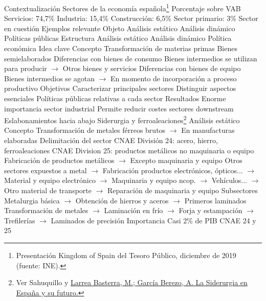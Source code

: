 \documentclass{nuevotema}
\begin{document}
\begin{esquemal}
	\1[] 
		\2 Contextualización
			\3 Sectores de la economía española\footnote{Presentación Kingdom of Spain del Tesoro Público, diciembre de 2019 (fuente: INE).}
				\4 Porcentaje sobre VAB
				\4 Servicios: 74,7\%
				\4 Industria: 15,4\%
				\4 Construcción: 6,5\%
				\4 Sector primario: 3\%
			\3 Sector en cuestión
			\3 Ejemplos relevante
		\2 Objeto
			\3 Análisis estático
			\3 Análisis dinámico
			\3 Políticas públicas
		\2 Estructura
			\3 Análisis estático
			\3 Análisis dinámico
			\3 Política económica
	\1 
		\2 Idea clave
			\3 Concepto
				\4 Transformación de materias primas
				\4[$\to$] Bienes semielaborados
				\4 Diferencias con bienes de consumo
				\4[] Bienes intermedios se utilizan para producir
				\4[] $\to$ Otros bienes y servicios
				\4 Diferencias con bienes de equipo
				\4[] Bienes intermedios se agotan
				\4[] $\to$ En momento de incorporación a proceso productivo
			\3 Objetivos
				\4 Caracterizar principales sectores
				\4 Distinguir aspectos esenciales
				\4 Políticas públicas relativas a cada sector
			\3 Resultados
				\4 Enorme importancia sector industrial
				\4 Permite reducir costes sectores downstream
				\4 Eslabonamientos hacia abajo
		\2 Siderurgia y ferroaleaciones\footnote{Ver Sahuquillo y \href{https://www.mincotur.gob.es/Publicaciones/Publicacionesperiodicas/EconomiaIndustrial/RevistaEconomiaIndustrial/406/LARREA\%20Y\%20GARCIA.pdf}{Larrea Basterra, M.; García Berezo, A. La Siderurgia en España y su futuro.}}
			\3 Análisis estático
				\4 Concepto
				\4[] Transformación de metales férreos brutos
				\4[] $\to$ En manufacturas elaboradas
				\4 Delimitación del sector
				\4[] CNAE División 24: acero, hierro, ferroaleaciones
				\4[] CNAE Division 25: productos metálicos no maquinaria o equipo
				\4[] Fabricación de productos metálicos
				\4[] $\to$ Excepto maquinaria y equipo
				\4[] Otros sectores expuestos a metal
				\4[] $\to$ Fabricación productos electrónicos, ópticos...
				\4[] $\to$ Material y equipo electrónico
				\4[] $\to$ Maquinaria y equipo ncop.
				\4[] $\to$ Vehículos...
				\4[] $\to$ Otro material de transporte
				\4[] $\to$ Reparación de maquinaria y equipo
				\4 Subsectores
				\4[] Metalurgia básica
				\4[] $\to$ Obtención de hierros y aceros
				\4[] $\to$ Primeros laminados
				\4[] Transformación de metales
				\4[] $\to$ Laminación en frío
				\4[] $\to$ Forja y estampación
				\4[] $\to$ Trefilerías
				\4[] $\to$ Laminados de precisión
				\4 Importancia
				\4[] Casi 2\% de PIB CNAE 24 y 25

\end{esquemal}
\end{document}
